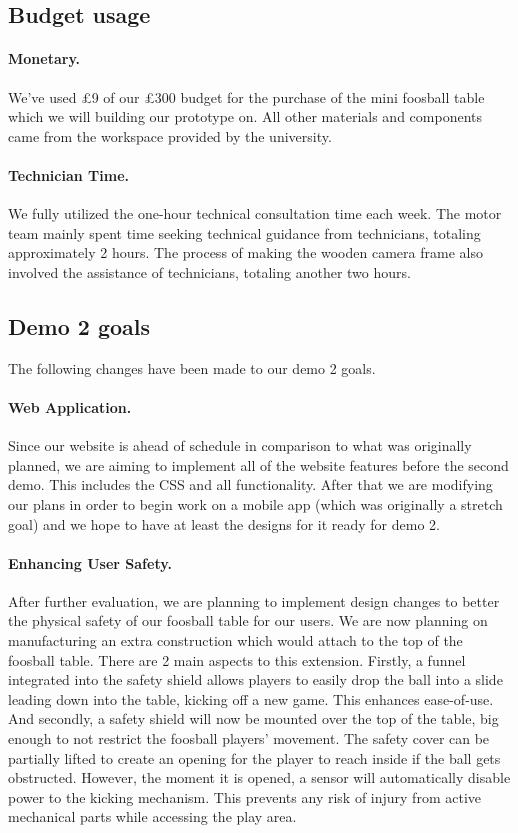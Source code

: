 \documentclass{article}
\begin{document}
\subsection{Budget usage}
\paragraph{Monetary.} We've used £9 of our £300 budget for the purchase of the mini foosball table which we will building our prototype on. All other materials and components came from the workspace provided by the university. 

\paragraph{Technician Time.} We fully utilized the one-hour technical consultation time each week. The motor team mainly spent time seeking technical guidance from technicians, totaling approximately 2 hours. The process of making the wooden camera frame also involved the assistance of technicians, totaling another two hours.

\subsection{Demo 2 goals}
The following changes have been made to our demo 2 goals. 
\paragraph{Web Application.} Since our website is ahead of schedule in comparison to what was originally planned, we are aiming to implement  all of the website features before the second demo. This includes the CSS and all functionality. After that we are modifying our plans in order to begin work on a mobile app (which was originally a stretch goal) and we hope to have at least the designs for it ready for demo 2.


\paragraph{Enhancing User Safety.} After further evaluation, we are planning to implement design changes to better the physical safety of our foosball table for our users. We are now planning on manufacturing an extra construction which would attach to the top of the foosball table. There are 2 main aspects to this extension. Firstly, a funnel integrated into the safety shield allows players to easily drop the ball into a slide leading down into the table, kicking off a new game. This enhances ease-of-use. And secondly, a safety shield will now be mounted over the top of the table, big enough to not restrict the foosball players’ movement. The safety cover can be partially lifted to create an opening for the player to reach inside if the ball gets obstructed. However, the moment it is opened, a sensor will automatically disable power to the kicking mechanism. This prevents any risk of injury from active mechanical parts while accessing the play area.
\end{document}
